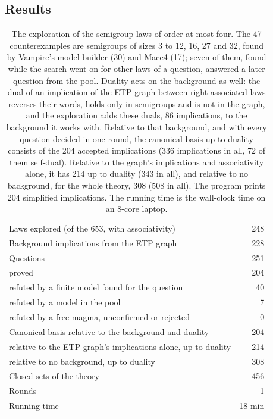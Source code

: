 \documentclass[11pt,a4paper]{article}
\theoremstyle{definition}
\theoremstyle{remark}
\begin{document}
\subsection{Results}

\begin{table}[!htbp]
\centering
\small
\begin{tabularx}{\textwidth}{@{}Xr@{}}
\toprule
Laws explored (of the 653, with associativity) & 248 \\
Background implications from the ETP graph & 228 \\
Questions & 251 \\
\quad proved & 204 \\
\quad refuted by a finite model found for the question & 40 \\
\quad refuted by a model in the pool & 7 \\
\quad refuted by a free magma, unconfirmed or rejected & 0 \\
Canonical basis relative to the background and duality & 204 \\
\quad relative to the ETP graph's implications alone, up to duality & 214 \\
\quad relative to no background, up to duality & 308 \\
Closed sets of the theory & 456 \\
Rounds & 1 \\
Running time & 18 min \\
\bottomrule
\end{tabularx}
\caption{The exploration of the semigroup laws of order at most four. The 47 counterexamples are semigroups of sizes 3 to 12, 16, 27 and 32, found by Vampire's model builder (30) and Mace4 (17); seven of them, found while the search went on for other laws of a question, answered a later question from the pool. Duality acts on the background as well: the dual of an implication of the ETP graph between right-associated laws reverses their words, holds only in semigroups and is not in the graph, and the exploration adds these duals, 86 implications, to the background it works with. Relative to that background, and with every question decided in one round, the canonical basis up to duality consists of the 204 accepted implications (336 implications in all, 72 of them self-dual). Relative to the graph's implications and associativity alone, it has 214 up to duality (343 in all), and relative to no background, for the whole theory, 308 (508 in all). The program prints 204 simplified implications. The running time is the wall-clock time on an 8-core laptop.}\label{tab:semigroups}
\end{table}
\end{document}
